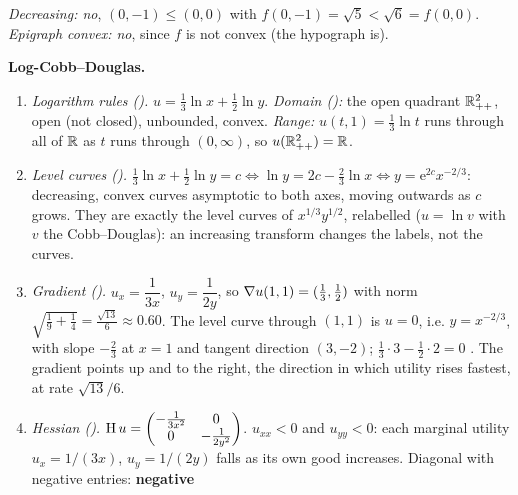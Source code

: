 \begin{solutions}
\begin{enumerate}[label=(\alph*),leftmargin=1.8em,itemsep=0.4ex]
                \emph{Decreasing: no}, $(0,-1)\le(0,0)$ with
                $f(0,-1)=\sqrt5<\sqrt6=f(0,0)$.
                \emph{Epigraph convex: no}, since $f$ is not convex (the
                hypograph is).
        \end{enumerate}
  \item \textbf{Log-Cobb--Douglas.}
        \begin{enumerate}[label=(\alph*),leftmargin=1.8em,itemsep=0.4ex]
          \item \emph{Logarithm rules ().}
                $u=\tfrac13\ln x+\tfrac12\ln y$. \emph{Domain
                ():} the open quadrant $\mathbb{R}^{2}_{++}$, open
                (not closed), unbounded, convex. \emph{Range:}
                $u(t,1)=\tfrac13\ln t$ runs through all of $\mathbb{R}$ as $t$
                runs through $(0,\infty)$, so $u(\mathbb{R}^{2}_{++})=\mathbb{R}$.
          \item \emph{Level curves ().}
                $\tfrac13\ln x+\tfrac12\ln y=c\iff\ln y=2c-\tfrac23\ln x
                \iff y=\mathrm{e}^{2c}x^{-2/3}$: decreasing, convex curves
                asymptotic to both axes, moving outwards as $c$ grows. They
                are exactly the level curves of $x^{1/3}y^{1/2}$, relabelled
                ($u=\ln v$ with $v$ the Cobb--Douglas): an increasing
                transform changes the labels, not the curves.
          \item \emph{Gradient ().} $u_{x}=\dfrac{1}{3x}$,
                $u_{y}=\dfrac{1}{2y}$, so $\nabla u(1,1)=(\tfrac13,\tfrac12)$
                with norm $\sqrt{\tfrac19+\tfrac14}=\tfrac{\sqrt{13}}{6}
                \approx0.60$. The level curve through $(1,1)$ is $u=0$, i.e.
                $y=x^{-2/3}$, with slope $-\tfrac23$ at $x=1$ and tangent
                direction $(3,-2)$; $\tfrac13\cdot3-\tfrac12\cdot2=0$
                \checkmark. The gradient points up and to the right, the
                direction in which utility rises fastest, at rate
                $\sqrt{13}/6$.
          \item \emph{Hessian ().}
                $\operatorname{H} u=\begin{pmatrix}-\frac{1}{3x^{2}}&0\\0&-\frac{1}{2y^{2}}
                \end{pmatrix}$. $u_{xx}<0$ and $u_{yy}<0$: each marginal
                utility $u_{x}=1/(3x)$, $u_{y}=1/(2y)$ falls as its own good
                increases. Diagonal with negative entries: \textbf{negative
}
\end{enumerate}
\end{solutions}
